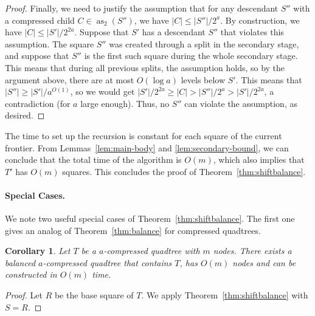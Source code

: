 \documentclass[11pt]{paper}
\DeclareMathOperator {\as}{as}
\newtheorem {cor}[theorem] {Corollary}
\begin{document}
\begin{proof}
      Finally, we need to justify the assumption that for any descendant $S''$
      with a compressed child $C \in \as_2(S'')$, we have $|C| \leq |S''|/2^a$.
      By construction, we have $|C| \leq |S'|/2^{2a}$. Suppose that $S'$
      has a descendant $S''$ that violates this assumption. The square $S''$ was
      created through a split in the secondary stage, and suppose that $S''$
      is the first such square during the whole secondary stage. This means
      that during all previous splits, the assumption holds, so by the
      argument above, there are at most $O(\log a)$ levels below $S'$. 
      This means that $|S''| \geq |S'|/a^{O(1)}$, so we would get
      $|S'|/2^{2a} \geq |C| > |S''|/2^a > |S'|/2^{2a}$,
      a contradiction (for $a$ large enough). Thus, no $S''$ can violate the
      assumption, as desired.
      \end{proof}
       
      The time to set up the recursion is constant for each square of the
      current frontier. From Lemmas~\ref{lem:main-body} and 
      \ref{lem:secondary-bound}, we can conclude that the total time of
      the algorithm is $O(m)$, which also implies that $T'$ has $O(m)$
      squares. This concludes the proof of Theorem~\ref{thm:shiftbalance}.

    \paragraph{Special Cases.}
    We note two useful special cases of Theorem~\ref{thm:shiftbalance}.
    The first one gives an analog of Theorem~\ref{thm:balance} for compressed
    quadtrees.
    \begin {cor} \label {cor:balance-'n-thread}
      Let $T$ be a $a$-compressed quadtree with $m$ nodes. 
      There exists a balanced $a$-compressed quadtree that contains $T$,
      has $O (m)$ nodes and can be constructed in $O (m)$ time.
    \end {cor}

   \begin{proof}
      Let $R$ be the base square of $T$. We apply 
      Theorem~\ref{thm:shiftbalance} with $S = R$. 
   \end{proof}
\end{document}
